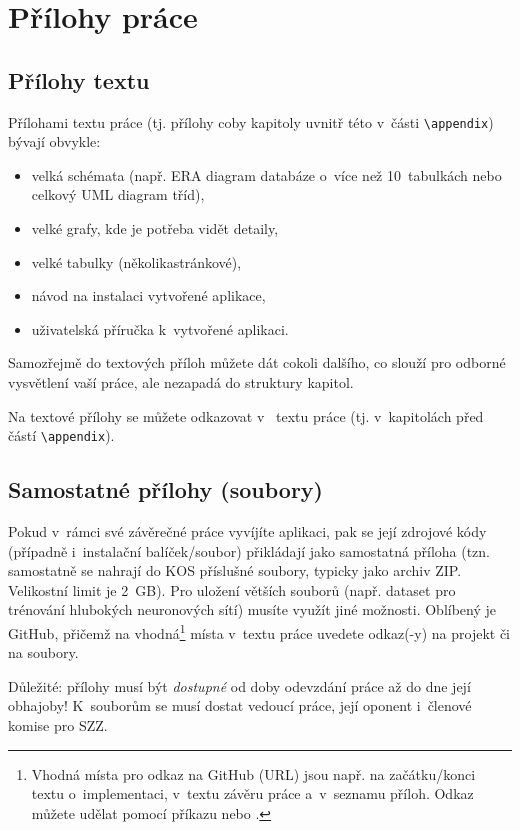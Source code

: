 \section{Přílohy práce}\label{nahraniPriloh}

\subsection{Přílohy textu}
Přílohami textu práce (tj. přílohy coby kapitoly uvnitř této  v~části \texttt{\textbackslash appendix}) bývají obvykle:
\begin{itemize}\itemsep=1pt
    \item velká schémata (např. ERA diagram databáze o~více než 10~tabulkách nebo celkový UML diagram tříd),
    \item velké grafy, kde je potřeba vidět detaily,
    \item velké tabulky (několikastránkové),
    \item návod na instalaci vytvořené aplikace,
    \item uživatelská příručka k~vytvořené aplikaci.
\end{itemize} 
Samozřejmě do textových příloh můžete dát cokoli dalšího, co slouží pro odborné vysvětlení vaší práce, ale nezapadá do struktury  kapitol.\par
Na textové přílohy se můžete odkazovat v~ textu práce (tj. v~kapitolách před částí \texttt{\textbackslash appendix}).

\subsection{Samostatné přílohy (soubory)}
Pokud v~rámci své závěrečné práce vyvíjíte aplikaci, pak se její zdrojové kódy (případně i~instalační balíček/soubor) přikládají jako samostatná příloha (tzn. samostatně se nahrají do KOS příslušné soubory, typicky jako archiv ZIP. Velikostní limit je 2~GB). Pro uložení větších souborů (např. dataset pro trénování hlubokých neuronových sítí) musíte využít jiné možnosti. Oblíbený je GitHub, přičemž na vhodná\footnote{Vhodná místa pro odkaz na GitHub (URL) jsou např. na začátku/konci textu o~implementaci, v~textu závěru práce a~v~seznamu příloh. Odkaz můžete udělat  pomocí příkazu  nebo .} místa v~textu práce uvedete odkaz(-y) na projekt či na soubory.
\par
Důležité: přílohy musí být \textit{dostupné} od doby odevzdání práce až do dne její obhajoby! K~souborům se musí dostat vedoucí práce, její oponent i~členové komise pro SZZ.


